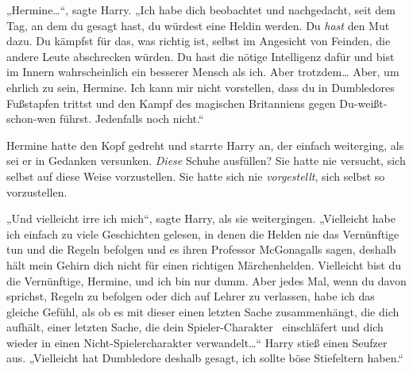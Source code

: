 „Hermine…“, sagte Harry. „Ich habe dich beobachtet und nachgedacht, seit dem Tag, an dem du gesagt hast, du würdest eine Heldin werden. Du \emph{hast} den Mut dazu. Du kämpfst für das, was richtig ist, selbst im Angesicht von Feinden, die andere Leute abschrecken würden. Du hast die nötige Intelligenz dafür und bist im Innern wahrscheinlich ein besserer Mensch als ich. Aber trotzdem… Aber, um ehrlich zu sein, Hermine. Ich kann mir nicht vorstellen, dass du in Dumbledores Fußstapfen trittst und den Kampf des magischen Britanniens gegen Du-weißt-schon-wen führst. Jedenfalls noch nicht.“

Hermine hatte den Kopf gedreht und starrte Harry an, der einfach weiterging, als sei er in Gedanken versunken. \emph{Diese} Schuhe ausfüllen? Sie hatte nie versucht, sich selbst auf diese Weise vorzustellen. Sie hatte sich nie \emph{vorgestellt}, sich selbst so vorzustellen.

„Und vielleicht irre ich mich“, sagte Harry, als sie weitergingen. „Vielleicht habe ich einfach zu viele Geschichten gelesen, in denen die Helden nie das Vernünftige tun und die Regeln befolgen und es ihren Professor McGonagalls sagen, deshalb hält mein Gehirn dich nicht für einen richtigen Märchenhelden. Vielleicht bist du die Vernünftige, Hermine, und ich bin nur dumm. Aber jedes Mal, wenn du davon sprichst, Regeln zu befolgen oder dich auf Lehrer zu verlassen, habe ich das gleiche Gefühl, als ob es mit dieser einen letzten Sache zusammenhängt, die dich aufhält, einer letzten Sache, die dein Spieler-Charakter ~einschläfert und dich wieder in einen Nicht-Spielercharakter verwandelt…“ Harry stieß einen Seufzer aus. „Vielleicht hat Dumbledore deshalb gesagt, ich sollte böse Stiefeltern haben.“

